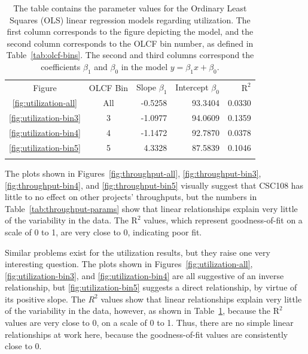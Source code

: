\begin{table}
\caption{The table contains the parameter values for the Ordinary Least Squares
(OLS) linear regression models regarding utilization. The first column
corresponds to the figure depicting the model, and the second column
corresponds to the OLCF bin number, as defined in Table~\ref{tab:olcf-bins}.
The second and third columns correspond the coefficients $\beta_1$ and
$\beta_0$ in the model $y = \beta_{1}x + \beta_0$.}
\label{tab:utilization-params}       %
\begin{tabular}{ccrrr}
\hline\noalign{\smallskip}
Figure  & OLCF Bin & Slope $\beta_1$  & Intercept $\beta_0$  &  $\text{R}^2$ \\
\noalign{\smallskip}\hline\noalign{\smallskip}
\ref{fig:utilization-all}    &   All &  -0.5258 &   93.3404     &   0.0330  \\
\ref{fig:utilization-bin3}   &   3   &  -1.0977 &   94.0609     &   0.1359  \\
\ref{fig:utilization-bin4}   &   4   &  -1.1472 &   92.7870     &   0.0378  \\
\ref{fig:utilization-bin5}   &   5   &   4.3328 &   87.5839     &   0.1046  \\
\noalign{\smallskip}\hline
\end{tabular}
\end{table}

The plots shown in Figures~\ref{fig:throughput-all}, \ref{fig:throughput-bin3},
\ref{fig:throughput-bin4}, and \ref{fig:throughput-bin5} visually suggest that
CSC108 has little to no effect on other projects' throughputs, but the numbers
in Table~\ref{tab:throughput-params} show that linear relationships explain
very little of the variability in the data. The $\text{R}^2$ values, which
represent goodness-of-fit on a scale of 0 to 1, are very close to 0, indicating
poor fit.

Similar problems exist for the utilization results, but they raise one very
interesting question. The plots shown in Figures~\ref{fig:utilization-all},
\ref{fig:utilization-bin3}, and \ref{fig:utilization-bin4} are all suggestive
of an inverse relationship, but \ref{fig:utilization-bin5} suggests a direct
relationship, by virtue of its positive slope. The $R^2$ values show that
linear relationships explain very little of the variability in the data,
however, as shown in Table~\ref{tab:utilization-params}, because the
$\text{R}^2$ values are very close to 0, on a scale of 0 to 1. Thus, there are
no simple linear relationships at work here, because the goodness-of-fit values
are consistently close to 0.

